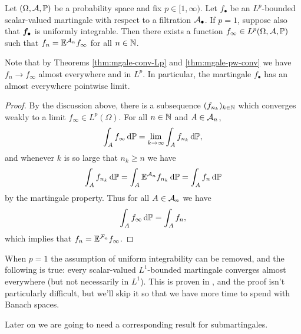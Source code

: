 \begin{thm}\label{thm:mgale-cv-repn}
  Let $(\Omega,\mathcal{A},\mathbb{P})$ be a probability space and fix $p \in [1,\infty)$.
  Let $f_{\bullet}$ be an $L^p$-bounded scalar-valued martingale with respect to a filtration $\mathcal{A}_{\bullet}$.
  If $p = 1$, suppose also that $\bm{f}_{\bullet}$ is uniformly integrable.
  Then there exists a function $f_\infty \in L^p(\Omega,\mathcal{A},\mathbb{P})$ such that $f_n = \mathbb{E}^{\mathcal{A}_n} f_\infty$ for all $n \in \mathbb{N}$.
\end{thm}

Note that by Theorems \ref{thm:mgale-conv-Lp} and \ref{thm:mgale-pw-conv} we have $f_n \to f_\infty$ almost everywhere and in $L^p$.
In particular, the martingale $f_{\bullet}$ has an almost everywhere pointwise limit.

\begin{proof}
  By the discussion above, there is a subsequence $(f_{n_k})_{k \in \mathbb{N}}$ which converges weakly to a limit $f_\infty \in L^p(\Omega)$.
  For all $n \in \mathbb{N}$ and $A \in \mathcal{A}_n$,
  \begin{equation*}
    \int_A f_\infty \, \mathrm{d}\mathbb{P} = \lim_{k \to \infty} \int_A f_{n_k} \, \mathrm{d}\mathbb{P},
  \end{equation*}
  and whenever $k$ is so large that $n_k \geq n$ we have
  \begin{equation*}
    \int_A f_{n_k} \, \mathrm{d}\mathbb{P} = \int_A \mathbb{E}^{\mathcal{A}_n} f_{n_k} \, \mathrm{d} \mathbb{P} = \int_A f_{n} \, \mathrm{d}\mathbb{P}
  \end{equation*}
  by the martingale property.
  Thus for all $A \in \mathcal{A}_n$ we have
  \begin{equation*}
    \int_A f_\infty \, \mathrm{d}\mathbb{P} = \int_A f_n,
  \end{equation*}
  which implies that $f_n = \mathbb{E}^{\mathcal{F}_n} f_\infty$.
\end{proof}

\begin{rmk}\label{rmk:mgale-cv-p1}
  When $p = 1$ the assumption of uniform integrability can be removed, and the following is true: every scalar-valued $L^1$-bounded martingale converges almost everywhere (but not necessarily in $L^1$).
  This is proven in \cite[Theorem 1.34]{gP16}, and the proof isn't particularly difficult, but we'll skip it so that we have more time to spend with Banach spaces.
\end{rmk}

Later on we are going to need a corresponding result for submartingales.

